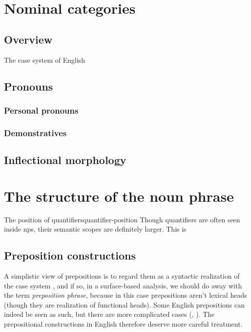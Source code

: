 \documentclass[UTF8, a4paper, oneside, scheme=plain]{ctexrep}
\newcommand*{\citepage}[1]{pp.~{#1}}
\newcommand*{\term}[1]{\emph{#1}}
\begin{document}
\chapter{Nominal categories}\label{chap:nouns}

\section{Overview}\label{sec:nouns.overview}

The case system of English 

\section{Pronouns}

\subsection{Personal pronouns}

\subsection{Demonstratives}


\section{Inflectional morphology}\label{chap:nouns.inflection}

\chapter{The structure of the noun phrase}\label{chap:np}

\begin{theorybox}{The position of quantifiers}{quantifier-position}
    Though quantifiers are often seen inside \acs{np}s,
    their semantic scopes are definitely larger.
    This is 
\end{theorybox}

\section{Preposition constructions}

A simplistic view of prepositions is to regard them as a syntactic realization of the case system
\citep[\citepage{49}]{dixon2009basic1},
and if so,
in a surface-based analysis,
we should do away with the term \term{preposition phrase},
because in this case prepositions aren't lexical heads
(though they are realization of functional heads).
Some English prepositions can indeed be seen as such,
but there are more complicated cases 
(, ).
The prepositional constructions in English therefore deserve more careful treatment.
\end{document}
